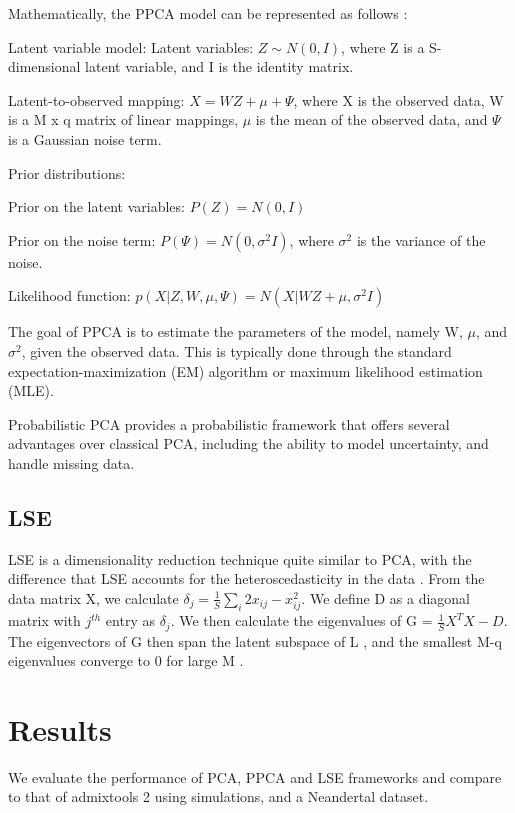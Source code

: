 \documentclass[12pt, letterpaper]{article}
\begin{document}
Mathematically, the PPCA model can be represented as follows \cite{tipping_probabilistic_nodate}:

Latent variable model:
Latent variables: $Z \sim N(0, I)$, where Z is a S-dimensional latent variable, and I is the identity matrix.

Latent-to-observed mapping: $X = WZ + \mu + \Psi$, where X is the observed data, W is a M x q matrix of linear mappings, $\mu$ is the mean of the observed data, and $\Psi$ is a Gaussian noise term.

Prior distributions:

Prior on the latent variables: $P(Z) = N(0, I)$

Prior on the noise term: $P(\Psi) = N(0, \sigma^2I)$, where $\sigma^2$ is the variance of the noise.

Likelihood function:
$p(X|Z, W, \mu, \Psi) = N(X|WZ + \mu, \sigma^2I)$

The goal of PPCA is to estimate the parameters of the model, namely W, $\mu$, and $\sigma^2$, given the observed data. This is typically done through the standard expectation-maximization (EM) algorithm or maximum likelihood estimation (MLE).

Probabilistic PCA provides a probabilistic framework that offers several advantages over classical PCA, including the ability to model uncertainty, and handle missing data. 

\subsection{LSE}

LSE is a dimensionality reduction technique quite similar to PCA, with the difference that LSE accounts for the heteroscedasticity in the data \cite{chen_consistent_2015}. From the data matrix X, we calculate $\delta_j = \frac{1}{S}\sum_i2x_{ij} - x_{ij}^2$. We define D as a diagonal matrix with $j^{th}$ entry as $\delta_j$. We then calculate the eigenvalues of G = $\frac{1}{S}X^TX - D$. The eigenvectors of G then span the latent subspace of L , and the smallest M-q eigenvalues converge to 0 for large M \cite{cabreros_likelihood-free_2019}. 




\section{Results}

We evaluate the performance of PCA, PPCA and LSE frameworks and compare to that of admixtools 2 using simulations, and a Neandertal dataset. 
\end{document}
